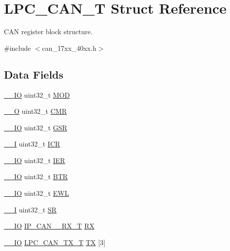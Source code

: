 \hypertarget{structLPC__CAN__T}{\section{L\-P\-C\-\_\-\-C\-A\-N\-\_\-\-T Struct Reference}
\label{structLPC__CAN__T}
}


C\-A\-N register block structure.  




{\ttfamily \#include $<$can\-\_\-17xx\-\_\-40xx.\-h$>$}

\subsection*{Data Fields}
\begin{DoxyCompactItemize}
\item 
\hyperlink{core__cm3_8h_aec43007d9998a0a0e01faede4133d6be}{\-\_\-\-\_\-\-I\-O} uint32\-\_\-t \hyperlink{structLPC__CAN__T_a8bc39ce9227ace84de55a902d60cb11e}{M\-O\-D}
\item 
\hyperlink{core__cm3_8h_a7e25d9380f9ef903923964322e71f2f6}{\-\_\-\-\_\-\-O} uint32\-\_\-t \hyperlink{structLPC__CAN__T_a2b22d55ceb4c934524714384f23cc87e}{C\-M\-R}
\item 
\hyperlink{core__cm3_8h_aec43007d9998a0a0e01faede4133d6be}{\-\_\-\-\_\-\-I\-O} uint32\-\_\-t \hyperlink{structLPC__CAN__T_ae36d4c72254feab1bce53a7653612acc}{G\-S\-R}
\item 
\hyperlink{core__cm3_8h_af63697ed9952cc71e1225efe205f6cd3}{\-\_\-\-\_\-\-I} uint32\-\_\-t \hyperlink{structLPC__CAN__T_a8ccbac222a59bb6da7ba81f8394dbb2e}{I\-C\-R}
\item 
\hyperlink{core__cm3_8h_aec43007d9998a0a0e01faede4133d6be}{\-\_\-\-\_\-\-I\-O} uint32\-\_\-t \hyperlink{structLPC__CAN__T_a2ab9628e17449ba6a3bfa9c8479c2e8a}{I\-E\-R}
\item 
\hyperlink{core__cm3_8h_aec43007d9998a0a0e01faede4133d6be}{\-\_\-\-\_\-\-I\-O} uint32\-\_\-t \hyperlink{structLPC__CAN__T_a2ef6231da82a2f3f55f05797f8ac4fa0}{B\-T\-R}
\item 
\hyperlink{core__cm3_8h_aec43007d9998a0a0e01faede4133d6be}{\-\_\-\-\_\-\-I\-O} uint32\-\_\-t \hyperlink{structLPC__CAN__T_ab79cd2d466c6f59c3bb43873fd556af6}{E\-W\-L}
\item 
\hyperlink{core__cm3_8h_af63697ed9952cc71e1225efe205f6cd3}{\-\_\-\-\_\-\-I} uint32\-\_\-t \hyperlink{structLPC__CAN__T_a16d0fa727f1fbcff03739b512b00806d}{S\-R}
\item 
\hyperlink{core__cm3_8h_aec43007d9998a0a0e01faede4133d6be}{\-\_\-\-\_\-\-I\-O} \hyperlink{structIP__CAN__001__RX__T}{I\-P\-\_\-\-C\-A\-N\-\_\-\_\-\-R\-X\-\_\-\-T} \hyperlink{structLPC__CAN__T_a9890a3ed561ea1e0fbce9a2d6321ac39}{R\-X}
\item 
\hyperlink{core__cm3_8h_aec43007d9998a0a0e01faede4133d6be}{\-\_\-\-\_\-\-I\-O} \hyperlink{structLPC__CAN__TX__T}{L\-P\-C\-\_\-\-C\-A\-N\-\_\-\-T\-X\-\_\-\-T} \hyperlink{structLPC__CAN__T_ad24f43de6447283b4379922cc1c83a1d}{T\-X} \mbox{[}3\mbox{]}
\end{DoxyCompactItemize}


